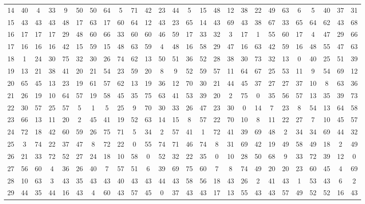 \begin{table}
\begin{tabular}{c c c c c c c c c c c c c c c c c c c c c c c c c c }
14 & 40 & 4 & 33 & 9 & 50 & 50 & 64 & 5 & 71 & 42 & 23 & 44 & 5 & 15 & 48 & 12 & 38 & 22 & 49 & 63 & 6 & 5 & 40 & 37 & 31 \\
15 & 43 & 43 & 43 & 48 & 17 & 63 & 17 & 60 & 64 & 12 & 43 & 23 & 65 & 14 & 43 & 69 & 43 & 38 & 67 & 33 & 65 & 64 & 62 & 43 & 68 \\
16 & 17 & 17 & 17 & 29 & 48 & 60 & 66 & 33 & 60 & 60 & 46 & 59 & 17 & 33 & 32 & 3 & 17 & 1 & 55 & 60 & 17 & 4 & 47 & 29 & 66 \\
17 & 16 & 16 & 16 & 42 & 15 & 59 & 15 & 48 & 63 & 59 & 4 & 48 & 16 & 58 & 29 & 47 & 16 & 63 & 42 & 59 & 16 & 48 & 55 & 47 & 63 \\
18 & 1 & 24 & 30 & 75 & 32 & 30 & 26 & 74 & 62 & 13 & 50 & 51 & 36 & 52 & 28 & 38 & 30 & 73 & 32 & 13 & 0 & 40 & 25 & 51 & 39 \\
19 & 13 & 21 & 38 & 41 & 20 & 21 & 54 & 23 & 59 & 20 & 8 & 9 & 52 & 59 & 57 & 11 & 64 & 67 & 25 & 53 & 11 & 9 & 54 & 69 & 12 \\
20 & 65 & 45 & 13 & 23 & 19 & 61 & 57 & 62 & 13 & 19 & 36 & 12 & 70 & 30 & 21 & 44 & 45 & 37 & 27 & 27 & 37 & 10 & 8 & 63 & 36 \\
21 & 26 & 19 & 10 & 64 & 57 & 19 & 58 & 45 & 35 & 75 & 63 & 41 & 53 & 39 & 20 & 2 & 75 & 0 & 35 & 56 & 57 & 13 & 35 & 39 & 73 \\
22 & 30 & 57 & 25 & 57 & 5 & 1 & 5 & 25 & 9 & 70 & 30 & 33 & 26 & 47 & 23 & 30 & 0 & 14 & 7 & 23 & 8 & 54 & 13 & 64 & 58 \\
23 & 66 & 13 & 11 & 20 & 2 & 45 & 41 & 19 & 52 & 63 & 14 & 15 & 8 & 57 & 22 & 70 & 10 & 8 & 11 & 22 & 27 & 7 & 10 & 45 & 57 \\
24 & 72 & 18 & 42 & 60 & 59 & 26 & 75 & 71 & 5 & 34 & 2 & 57 & 41 & 1 & 72 & 41 & 39 & 69 & 48 & 2 & 34 & 34 & 69 & 44 & 32 \\
25 & 3 & 74 & 22 & 37 & 47 & 8 & 72 & 22 & 0 & 55 & 74 & 71 & 46 & 74 & 8 & 31 & 69 & 42 & 19 & 49 & 58 & 49 & 18 & 2 & 49 \\
26 & 21 & 33 & 72 & 52 & 27 & 24 & 18 & 10 & 58 & 0 & 52 & 32 & 22 & 35 & 0 & 10 & 28 & 50 & 68 & 9 & 33 & 72 & 39 & 12 & 0 \\
27 & 56 & 60 & 4 & 36 & 26 & 40 & 7 & 57 & 51 & 6 & 39 & 69 & 75 & 60 & 7 & 8 & 74 & 49 & 20 & 20 & 23 & 60 & 45 & 4 & 69 \\
28 & 10 & 63 & 3 & 43 & 35 & 43 & 43 & 40 & 43 & 43 & 44 & 43 & 58 & 56 & 18 & 43 & 26 & 2 & 41 & 43 & 1 & 53 & 43 & 6 & 2 \\
29 & 44 & 35 & 44 & 16 & 43 & 4 & 60 & 43 & 57 & 45 & 0 & 37 & 43 & 43 & 17 & 13 & 55 & 43 & 43 & 57 & 49 & 52 & 52 & 16 & 43 \\

\end{tabular}
\end{table}
